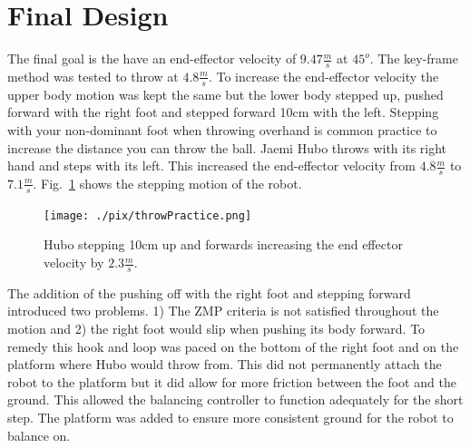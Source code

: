 \section{Final Design}\label{sec:finalDesign}

The final goal is the have an end-effector velocity of $9.47\frac{m}{s}$ at $45^o$.  
The key-frame method was tested to throw at $4.8\frac{m}{s}$.  
To increase the end-effector velocity the upper body motion was kept the same but the lower body stepped up, pushed forward with the right foot and stepped forward 10cm with the left.  
Stepping with your non-dominant foot when throwing overhand is common practice to increase the distance you can throw the ball.  
Jaemi Hubo throws with its right hand and steps with its left.  
This increased the end-effector velocity from $4.8\frac{m}{s}$ to $7.1\frac{m}{s}$.
Fig.~\ref{fig:hubo-step} shows the stepping motion of the robot.

\begin{figure}[t]
  \centering
\texttt{[image: ./pix/throwPractice.png]}
  \caption{Hubo stepping 10cm up and forwards increasing the end effector velocity by $2.3\frac{m}{s}$.}
  \label{fig:hubo-step}
\end{figure}

The addition of the pushing off with the right foot and stepping forward introduced two problems.  1) The ZMP criteria is not satisfied throughout the motion and 2) the right foot would slip when pushing its body forward.  
To remedy this hook and loop was paced on the bottom of the right foot and on the platform where Hubo would throw from.  
This did not permanently attach the robot to the platform but it did allow for more friction between the foot and the ground.
This allowed the balancing controller to function adequately for the short step.
The platform was added to ensure more consistent ground for the robot to balance on.


